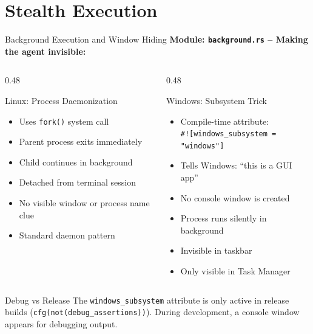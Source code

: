 \documentclass[aspectratio=169]{beamer}
\newcommand{\code}[1]{\texttt{\textcolor{primaryblue}{#1}}}
\begin{document}
\section{Stealth Execution}

\begin{frame}{Background Execution and Window Hiding}
  \textbf{Module: \code{background.rs} -- Making the agent invisible:}

  \vspace{0.5em}
  \begin{columns}[T]
    \begin{column}{0.48\textwidth}
      \begin{block}{Linux: Process Daemonization}
        \footnotesize
        \begin{itemize}
          \item Uses \code{fork()} system call
          \item Parent process exits immediately
          \item Child continues in background
          \item Detached from terminal session
          \item No visible window or process name clue
          \item Standard daemon pattern
        \end{itemize}
      \end{block}
    \end{column}
    \begin{column}{0.48\textwidth}
      \begin{block}{Windows: Subsystem Trick}
        \footnotesize
        \begin{itemize}
          \item Compile-time attribute:\\
            \code{\#![windows\_subsystem = "windows"]}
          \item Tells Windows: ``this is a GUI app''
          \item No console window is created
          \item Process runs silently in background
          \item Invisible in taskbar
          \item Only visible in Task Manager
        \end{itemize}
      \end{block}
    \end{column}
  \end{columns}

  \vspace{0.5em}
  \begin{infobox}{Debug vs Release}
    The \code{windows\_subsystem} attribute is only active in release builds (\code{cfg(not(debug\_assertions))}). During development, a console window appears for debugging output.
  \end{infobox}
\end{frame}
\end{document}
